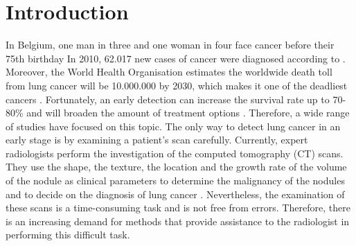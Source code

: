 \section{Introduction}
In Belgium, one man in three and one woman in four face cancer before their 75th
birthday \cite{kanker} In 2010, 62.017 new cases of cancer were diagnosed
according to \cite{kankerliga}. Moreover, the World Health Organisation
estimates the worldwide death toll from lung cancer will be 10.000.000 by 2030,
which makes it one of the deadliest cancers \cite{gu, zheng}. Fortunately, an
early detection can increase the survival rate up to 70-80\% \cite{swensen} and
will broaden the amount of treatment options \cite{greenlee}. Therefore, a wide
range of studies have focused on this topic. The only way to detect lung cancer
in an early stage is by examining a patient's scan carefully. Currently, expert
radiologists perform the investigation of the computed tomography (CT) scans.
They use the shape, the texture, the location and the growth rate of the volume
of the nodule as clinical parameters to determine the malignancy of the nodules
and to decide on the diagnosis of lung cancer \cite{wu}. Nevertheless, the
examination of these scans is a time-consuming task and is not free from errors.
Therefore, there is an increasing demand for methods that provide assistance
to the radiologist in performing this difficult task.

